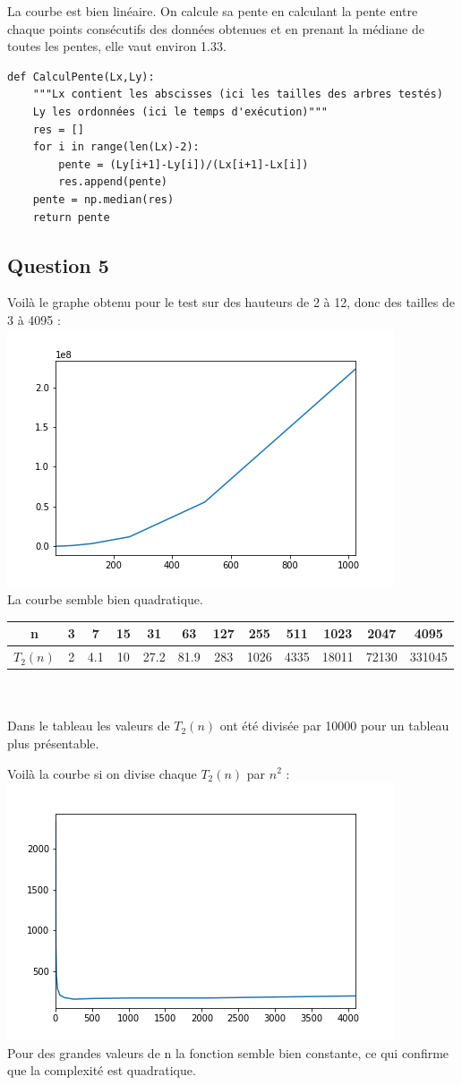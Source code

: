 \documentclass{article}
\begin{document}
La courbe est bien linéaire. On calcule sa pente en calculant la pente entre chaque points consécutifs des données obtenues et en prenant la médiane de toutes les pentes, elle vaut environ 1.33.\\
\begin{lstlisting}
def CalculPente(Lx,Ly):
    """Lx contient les abscisses (ici les tailles des arbres testés)
    Ly les ordonnées (ici le temps d'exécution)"""
    res = []
    for i in range(len(Lx)-2):
        pente = (Ly[i+1]-Ly[i])/(Lx[i+1]-Lx[i])
        res.append(pente)
    pente = np.median(res)
    return pente
\end{lstlisting}

\subsection{Question 5}

Voilà le graphe obtenu pour le test sur des hauteurs de 2 à 12, donc des tailles de 3 à 4095 : \\
\includegraphics[scale=0.5]{CalculSigma2.png} \\
La courbe semble bien quadratique. \\
\begin{tabular}{|c|c|c|c|c|c|c|c|c|c|c|c|}
\hline
n & 3 & 7 & 15 & 31 & 63 & 127 & 255 & 511 & 1023 & 2047 & 4095 \\
\hline
$T_2(n)$ & 2 & 4.1 & 10 & 27.2 & 81.9 & 283 & 1026 & 4335 & 18011 & 72130 & 331045 \\
\hline
\end{tabular} \\
\\
Dans le tableau les valeurs de $T_2(n)$ ont été divisée par 10000 pour un tableau plus présentable.

Voilà la courbe si on divise chaque $T_2(n)$ par $n^2$ : \\
\includegraphics[scale=0.5]{CalculSigma2Normalise.png} \\
Pour des grandes valeurs de n la fonction semble bien constante, ce qui confirme que la complexité est quadratique.
\end{document}

